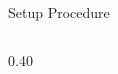 \begin{frame}{Setup Procedure}
\begin{columns}[T,onlytextwidth]
\begin{column}{0.40\textwidth}

        \end{column}

    \end{columns}
\end{frame}